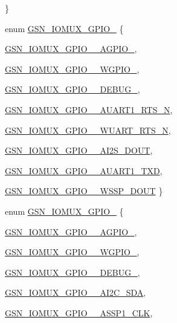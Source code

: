 \begin{DoxyCompactItemize}
 \}
\item 
enum \hyperlink{a00519_a90f5cd1f67094f859b76473c9184f580}{GSN\_\-IOMUX\_\-GPIO\_} \{ \par
\hyperlink{a00519_a90f5cd1f67094f859b76473c9184f580a5dcdaf8263c3665971865faf9295d3ec}{GSN\_\-IOMUX\_\-GPIO\_\_\-AGPIO\_}, 
\par
\hyperlink{a00519_a90f5cd1f67094f859b76473c9184f580a6c1fde199d44bd9b2ca9ca89c37357b1}{GSN\_\-IOMUX\_\-GPIO\_\_\-WGPIO\_}, 
\par
\hyperlink{a00519_a90f5cd1f67094f859b76473c9184f580ae6bc2f1304765b1f026ce7c05f345490}{GSN\_\-IOMUX\_\-GPIO\_\_\-DEBUG\_}, 
\par
\hyperlink{a00519_a90f5cd1f67094f859b76473c9184f580aa81a34c8e6878ac468864814120be7d7}{GSN\_\-IOMUX\_\-GPIO\_\_\-AUART1\_\-RTS\_\-N}, 
\par
\hyperlink{a00519_a90f5cd1f67094f859b76473c9184f580aaf109d7752c54d0ec31165c0bf4c52ff}{GSN\_\-IOMUX\_\-GPIO\_\_\-WUART\_\-RTS\_\-N}, 
\par
\hyperlink{a00519_a90f5cd1f67094f859b76473c9184f580a03093daf3e734be3a519e97961afc35e}{GSN\_\-IOMUX\_\-GPIO\_\_\-AI2S\_\-DOUT}, 
\par
\hyperlink{a00519_a90f5cd1f67094f859b76473c9184f580a5dc8b58a2582b561d61b1855d9ed013c}{GSN\_\-IOMUX\_\-GPIO\_\_\-AUART1\_\-TXD}, 
\par
\hyperlink{a00519_a90f5cd1f67094f859b76473c9184f580a728ff6ce45c87729622b6294b4b2b2b4}{GSN\_\-IOMUX\_\-GPIO\_\_\-WSSP\_\-DOUT}
 \}
\item 
enum \hyperlink{a00519_a8918e3cd7c1af54b48633d283956507f}{GSN\_\-IOMUX\_\-GPIO\_} \{ \par
\hyperlink{a00519_a8918e3cd7c1af54b48633d283956507fa887570666ced1dc125ed256957e1b7a7}{GSN\_\-IOMUX\_\-GPIO\_\_\-AGPIO\_}, 
\par
\hyperlink{a00519_a8918e3cd7c1af54b48633d283956507fa73b7d0d7fa1ceeb62ef73c0525133788}{GSN\_\-IOMUX\_\-GPIO\_\_\-WGPIO\_}, 
\par
\hyperlink{a00519_a8918e3cd7c1af54b48633d283956507fa9201338fdec6e71f1d74ff0a6dd31328}{GSN\_\-IOMUX\_\-GPIO\_\_\-DEBUG\_}, 
\par
\hyperlink{a00519_a8918e3cd7c1af54b48633d283956507fa1a020ed4947d62cfb07f0bb5f2e8b570}{GSN\_\-IOMUX\_\-GPIO\_\_\-AI2C\_\-SDA}, 
\par
\hyperlink{a00519_a8918e3cd7c1af54b48633d283956507fa6755484e2c4a239da71b903217b72d40}{GSN\_\-IOMUX\_\-GPIO\_\_\-ASSP1\_\-CLK}, 
\par

\end{DoxyCompactItemize}
